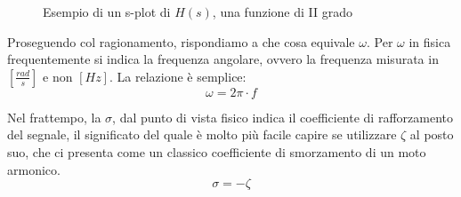 \documentclass[a4paper, 10pt, final]{article} %
\begin{document}
    \begin{figure}[!htb]
        \centering
        \hspace{0.15\textwidth}
        \caption{Esempio di un s-plot di $H(s)$, una funzione di II grado}
        \label{fig:ExampleSPlot}
    \end{figure}
    
    Proseguendo col ragionamento, rispondiamo a che cosa equivale \(\omega\).
    Per \(\omega\) in fisica frequentemente si indica la frequenza angolare, ovvero la frequenza misurata in \([\frac{rad}{s}]\) e non \([Hz]\). La relazione \`{e} semplice:
    \[ \omega = 2\pi\cdot f\]

    Nel frattempo, la \(\sigma\), dal punto di vista fisico indica il coefficiente di rafforzamento del segnale, il significato del quale \`{e} molto pi\`{u} facile capire se utilizzare \(\zeta\) al posto suo, che ci presenta come un classico coefficiente di smorzamento di un moto armonico.
    \[ \sigma = -\zeta\]
\end{document}
